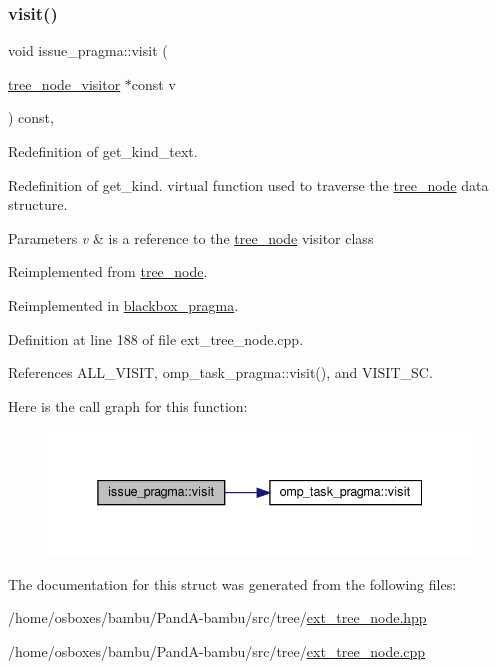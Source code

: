 \subsubsection{\texorpdfstring{visit()}{visit()}}
{\footnotesize\ttfamily void issue\+\_\+pragma\+::visit (\begin{DoxyParamCaption}\item[{\hyperlink{classtree__node__visitor}{tree\+\_\+node\+\_\+visitor} $\ast$const}]{v }\end{DoxyParamCaption}) const\hspace{0.3cm}{\ttfamily [override]}, {\ttfamily [virtual]}}



Redefinition of get\+\_\+kind\+\_\+text. 

Redefinition of get\+\_\+kind. virtual function used to traverse the \hyperlink{classtree__node}{tree\+\_\+node} data structure. 
\begin{DoxyParams}{Parameters}
{\em v} & is a reference to the \hyperlink{classtree__node}{tree\+\_\+node} visitor class \\
\hline
\end{DoxyParams}


Reimplemented from \hyperlink{classtree__node_aa9abba3f1b30e0be80b4a56b188c6ecc}{tree\+\_\+node}.



Reimplemented in \hyperlink{structblackbox__pragma_a8e85a8856e83d67730225e4a1e3297b9}{blackbox\+\_\+pragma}.



Definition at line 188 of file ext\+\_\+tree\+\_\+node.\+cpp.



References A\+L\+L\+\_\+\+V\+I\+S\+IT, omp\+\_\+task\+\_\+pragma\+::visit(), and V\+I\+S\+I\+T\+\_\+\+SC.

Here is the call graph for this function\+:
\nopagebreak
\begin{figure}[H]
\begin{center}
\leavevmode
\includegraphics[width=338pt]{d1/d90/structissue__pragma_afc993f822027243a8112c2b3f07bb17a_cgraph}
\end{center}
\end{figure}


The documentation for this struct was generated from the following files\+:\begin{DoxyCompactItemize}
\item 
/home/osboxes/bambu/\+Pand\+A-\/bambu/src/tree/\hyperlink{ext__tree__node_8hpp}{ext\+\_\+tree\+\_\+node.\+hpp}\item 
/home/osboxes/bambu/\+Pand\+A-\/bambu/src/tree/\hyperlink{ext__tree__node_8cpp}{ext\+\_\+tree\+\_\+node.\+cpp}\end{DoxyCompactItemize}
